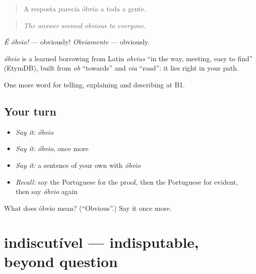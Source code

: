 \begin{quote}
A resposta parecia óbvia a toda a gente.
\end{quote}

\begin{quote}
\emph{The answer seemed obvious to everyone.}
\end{quote}

\emph{É óbvio!} — obviously! \emph{Obviamente} — obviously.

\begin{cousinweb}
\emph{óbvio} is a learned borrowing from Latin \emph{obvius} \textquotedblleft{}in the way, meeting, easy to find\textquotedblright{} (EtymDB), built from \emph{ob} \textquotedblleft{}towards\textquotedblright{} and \emph{via} \textquotedblleft{}road\textquotedblright{}: it lies right in your path.
\end{cousinweb}

\begin{grammarlens}[title={What you've built}]
One more word for telling, explaining and describing at B1.
\end{grammarlens}

\subsection*{Your turn}
\begin{itemize}
\raggedright
  \item \emph{Say it:} \emph{óbvio}
  \item \emph{Say it:} \emph{óbvio}, once more
  \item \emph{Say it:} a sentence of your own with \emph{óbvio}
  \item \emph{Recall:} say the Portuguese for the proof, then the Portuguese for evident, then say \emph{óbvio} again
\end{itemize}

\begin{tcolorbox}[breakable,colback=teal!4,colframe=teal!35!black,title={Before you move on}]
What does óbvio mean? (\textquotedblleft{}Obvious\textquotedblright{}.) Say it once more.
\end{tcolorbox}
\section[indiscutível]{indiscutível — indisputable, beyond question}

\label{lesson:PT-C341-indiscutivel}



